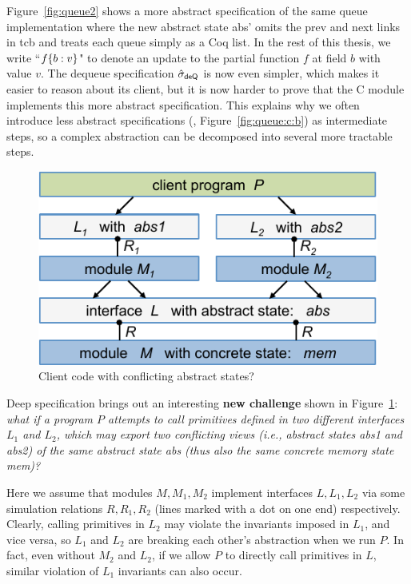 Figure~\ref{fig:queue2} shows a more abstract specification of the same
queue implementation where the new abstract state \textsf{abs'} omits
the \textsf{prev} and \textsf{next} links in \textsf{tcb} and treats each
queue simply as a Coq list. 
In the rest of this thesis, we write ``$f\{b:v\}$"
to denote an update to the partial function $f$ at field $b$ 
with value $v$.
The dequeue specification 
$\hat{\sigma}_\textsf{deQ}$ is now
even simpler, which makes it easier to reason about its client,
but it is now harder to prove that the C module
implements this more abstract specification.  This explains why we
often introduce less abstract specifications (\eg,
Figure~\ref{fig:queue:c:b}) as intermediate steps, so a
complex abstraction can be decomposed into several more tractable steps.


\begin{figure}[t]\centering
\includegraphics[scale=1]{figs/conflict}
\caption{Client code with conflicting abstract states?}
\hrulefill
\label{fig:conflict}
\end{figure}

Deep specification brings out an interesting {\bf new challenge}
shown in Figure~\ref{fig:conflict}: {\em what if a program $P$ attempts to
call primitives defined in two different interfaces $L_1$ and $L_2$,
which may export two conflicting views (i.e., abstract states
\textsf{abs1} and \textsf{abs2}) of the same abstract state \textsf{abs}
(thus also the same concrete memory state \textsf{mem})?}

Here we assume that modules $M, M_1, M_2$ implement interfaces $L,
L_1, L_2$ via some simulation relations $R, R_1, R_2$ (lines marked
with a dot on one end) respectively. Clearly, calling primitives in
$L_2$ may violate the invariants imposed in $L_1$, and vice versa,
so $L_1$ and $L_2$ are breaking each other's abstraction when we run
$P$. In fact, even without $M_2$ and $L_2$, if we allow $P$ to
directly call primitives in $L$, similar violation of $L_1$ invariants
can also occur.

